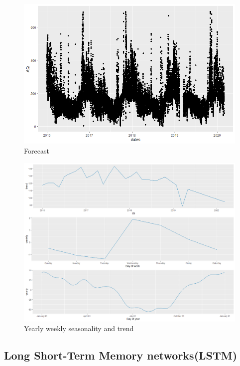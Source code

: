 \begin{figure}[h]
\label{bd}
\centering
\includegraphics[width= 15 cm]{proph1.png}
\caption{Forecast}
\end{figure} \pagebreak

\begin{figure}[h]
\label{bd}
\centering
\includegraphics[width= 11 cm]{r1.png}
\caption{Yearly weekly seasonality and trend}
\end{figure}

\subsection{Long Short-Term Memory networks(LSTM)}

